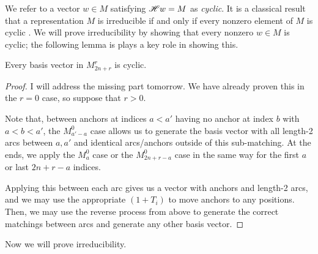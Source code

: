 \documentclass{amsart}
\begin{document}
We refer to a vector $w \in M$ satisfying $\mathscr{H} w = M$ as \emph{cyclic}.
It is a classical result that a representation $M$ is irreducible if and only if every nonzero element of $M$ is cyclic \cite{Etingof}.
We will prove irreducibility by showing that every nonzero $w \in M$ is cyclic;
the following lemma is plays a key role in showing this.

\begin{lemma}
  \label{Cyclic}
  Every basis vector in $M_{2n + r}^r$ is cyclic.
\end{lemma}
\begin{proof}
  {\color{magenta} I will address the missing part tomorrow.}
  We have already proven this in the $r = 0$ case, so suppose that $r > 0$.

  Note that, between anchors at indices $a<a'$ having no anchor at index $b$ with $a < b < a'$, the $M_{a'-a}^0$ case allows us to generate the basis vector with all length-2 arcs between $a,a'$ and identical arcs/anchors outside of this sub-matching.
  At the ends, we apply the $M_a^0$ case or the $M_{2n + r - a}^{0}$ case in the same way for the first $a$ or last $2n + r - a$ indices.

  Applying this between each arc gives us a vector with anchors and length-2 arcs, and we may use the appropriate $(1+T_i)$ to move anchors to any positions.
  Then, we may use the reverse process from above to generate the correct matchings between arcs and generate any other basis vector.
\end{proof}

Now we will prove irreducibility.
\end{document}
